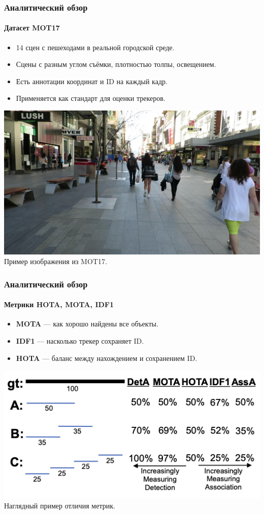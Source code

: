 \documentclass{beamer} %
\begin{document}
\begin{frame}
  \frametitle{Аналитический обзор}
  \framesubtitle{Датасет MOT17}
  \begin{itemize}
    \item 14 сцен с пешеходами в реальной городской среде.
    \item Сцены с разным углом съёмки, плотностью толпы, освещением.
    \item Есть аннотации координат и ID на каждый кадр.
    \item Применяется как стандарт для оценки трекеров.
  \end{itemize}
  \centering
  \includegraphics[width=0.7\linewidth]{images/review/MOT17_1.jpg}\\
  \small Пример изображения из MOT17.
\end{frame}

\begin{frame}
  \frametitle{Аналитический обзор}
  \framesubtitle{Метрики HOTA, MOTA, IDF1}
  \begin{itemize}
    \item \textbf{MOTA} — как хорошо найдены все объекты.
    \item \textbf{IDF1} — насколько трекер сохраняет ID.
    \item \textbf{HOTA} — баланс между нахождением и сохранением ID.
  \end{itemize}
  \centering
  \includegraphics[width=0.7\linewidth]{images/presentation/metrics.png}\\
  \small Наглядный пример отличия метрик.
\end{frame}
\end{document}
